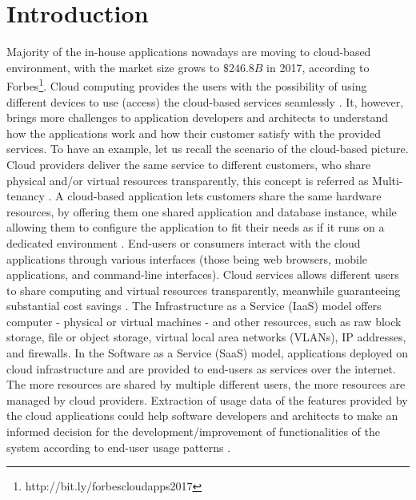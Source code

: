 \section{Introduction}\label{sec:Introduction}
Majority of the in-house applications nowadays are moving to cloud-based environment, with the market size grows to $\$246.8B$ in 2017, according to Forbes\footnote{http://bit.ly/forbescloudapps2017}. Cloud computing provides the users with the possibility of using different devices to use (access) the cloud-based services seamlessly \cite{Mell2011}. It, however, brings more challenges to application developers and architects to understand how the applications work and how their customer satisfy with the provided services. To have an example, let us recall the scenario of the cloud-based picture. Cloud providers deliver the same service to different customers, who share physical and/or virtual resources transparently, this concept is referred as Multi-tenancy \cite{Kabbedijk2015}.  A cloud-based application lets customers share the same hardware resources, by offering them one shared application and database instance, while allowing them to configure the application to fit their needs as if it runs on a dedicated environment \cite{Zaidman2010}. End-users or consumers interact with the cloud applications through various interfaces (those being web browsers, mobile applications, and command-line interfaces). Cloud services allows different users to share computing and virtual resources transparently, meanwhile guaranteeing substantial cost savings \cite{Bezemer2010}. The Infrastructure as a Service (IaaS) model offers computer - physical or virtual machines - and other resources, such as raw block storage, file or object storage, virtual local area networks (VLANs), IP addresses, and firewalls. In the Software as a Service (SaaS) model, applications deployed on cloud infrastructure and are provided to end-users as services over the internet. The more resources are shared by multiple different users, the more resources are managed by cloud providers. Extraction of usage data of the features provided by the cloud applications could help software developers and architects to make an informed decision for the development/improvement of functionalities of the system according to end-user usage patterns \cite{Pachidi2014}. 

